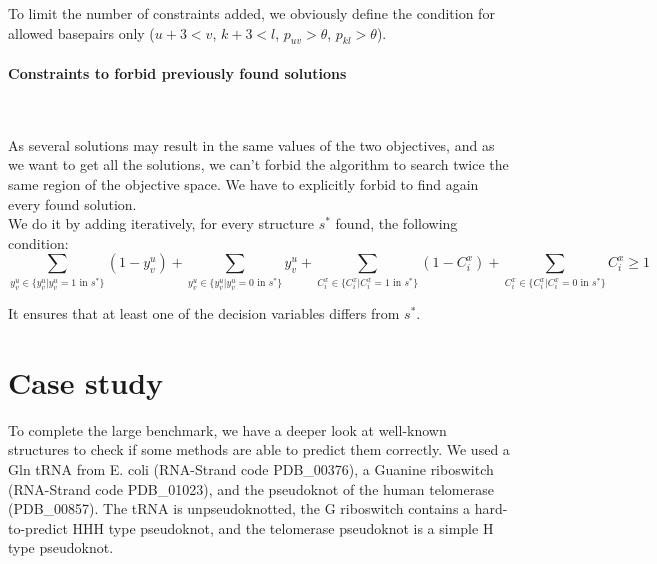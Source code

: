 \documentclass{article}
\begin{document}
To limit the number of constraints added, we obviously define the condition for allowed basepairs only ($u + 3 <v$, $k + 3 <l$, $p_{uv} > \theta$, $p_{kl} > \theta$).



\paragraph{Constraints to forbid previously found solutions} ~ 

As several solutions may result in the same values of the two objectives, and as we want to get all the solutions, we can't forbid the algorithm to search twice the same region of the objective space.
We have to explicitly forbid to find again every found solution.\\
We do it by adding iteratively, for every structure $s^*$ found, the following condition:
\begin{equation}\label{constraint:10}
	\sum_{y^u_v \in \{ y^u_v  | y^u_v = 1 \text{ in } s^* \}} (1 - y^u_v) + \sum_{y^u_v \in \{ y^u_v  | y^u_v = 0 \text{ in } s^* \}} y^u_v +
	\sum_{C^x_i \in \{ C^x_i  | C^x_i = 1 \text{ in } s^* \}} (1 - C^x_i) + \sum_{C^x_i \in \{ C^x_i  |C^x_i = 0 \text{ in } s^* \}} C^x_i \geq 1
\end{equation}

It ensures that at least one of the decision variables differs from $s^*$.

\newpage
\section{Case study}

To complete the large benchmark, we have a deeper look at well-known structures to check if some methods are able to predict them correctly. We used a Gln tRNA from E. coli (RNA-Strand code PDB\_00376), a Guanine riboswitch (RNA-Strand code PDB\_01023), and the pseudoknot of the human telomerase (PDB\_00857). The tRNA is unpseudoknotted, the G riboswitch contains a hard-to-predict HHH type pseudoknot, and the telomerase pseudoknot is a simple H type pseudoknot.
\end{document}
